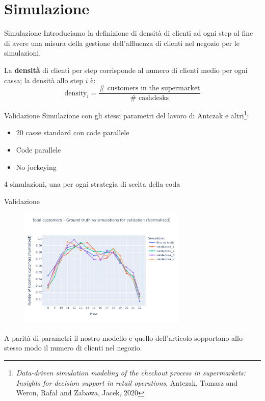 \section{Simulazione}
\begin{frame}{Simulazione}
	Introduciamo la definizione di densità di clienti ad ogni step al fine di avere una misura della gestione dell'affluenza di clienti nel negozio per le simulazioni.
	
	La \textbf{densità} di clienti per step corrisponde al numero di clienti medio per ogni cassa; la densità allo step $i$ è:
	\[\text{density}_i = \frac{\# \text{ customers in the supermarket}}{\# \text{ cashdesks}}\]

\end{frame}

\begin{frame}{Validazione}
	Simulazione con gli stessi parametri del lavoro di Antczak e altri\footnote{\textit{Data-driven simulation modeling of the checkout process in supermarkets: Insights for decision support in retail operations}, Antczak, Tomasz and Weron, Rafał and Zabawa, Jacek, 2020}: 
	\begin{itemize}
		\item 20 casse standard con code parallele
		\item Code parallele
		\item No jockeying
	\end{itemize}	
	4 simulazioni, una per ogni strategia di scelta della coda
\end{frame}

\begin{frame}{Validazione}
	\begin{figure}[H]
		\centering
		\includegraphics[width=8cm]{"../report/images/results/total_customers_validation.png"}
	\end{figure}
	A parità di parametri il nostro modello e quello dell'articolo sopportano allo stesso modo il numero di clienti nel negozio.
\end{frame}

